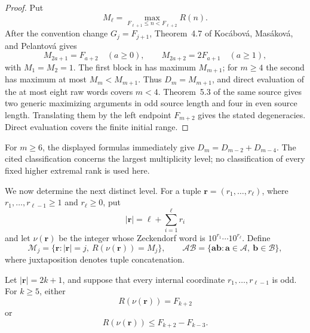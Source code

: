 \begin{proof}
Put
\[
 M_\ell=\max_{F_{\ell+1}\le n<F_{\ell+2}}R(n).
\]
After the convention change \(G_j=F_{j+1}\), Theorem~4.7 of
Koc\'abov\'a, Mas\'akov\'a, and Pelantov\'a
\cite{KocabovaMasakovaPelantova2005} gives
\[
 M_{2a+1}=F_{a+2}\quad(a\ge0),
 \qquad M_{2a+2}=2F_{a+1}\quad(a\ge1),
\]
with \(M_1=M_2=1\).  The first block in
 has maximum \(M_{m+1}\); for \(m\ge4\)
the second has maximum at most \(M_m<M_{m+1}\).  Thus
\(D_m=M_{m+1}\), and direct evaluation of the at most eight raw words covers
\(m<4\).  Theorem~5.3 of the same source gives two generic maximizing
arguments in odd source length and four in even source length.  Translating
them by the left endpoint \(F_{m+2}\) gives the stated degeneracies.  Direct
evaluation covers the finite initial range.
\end{proof}

For \(m\ge6\), the displayed formulas immediately give
\(D_m=D_{m-2}+D_{m-4}\).  The cited classification concerns the largest
multiplicity level; no classification of every fixed higher extremal rank is
used here.

We now determine the next distinct level.  For a tuple
\(\mathbf r=(r_1,\ldots,r_\ell)\), where
\(r_1,\ldots,r_{\ell-1}\ge1\) and \(r_\ell\ge0\), put
\[
 |\mathbf r|=\ell+\sum_{i=1}^\ell r_i
\]
and let \(\nu(\mathbf r)\) be the integer whose Zeckendorf word is
\(10^{r_1}\cdots10^{r_\ell}\).  Define
\[
 \mathscr M_j=\{\mathbf r:|\mathbf r|=j,\
 R(\nu(\mathbf r))=M_j\},
 \qquad
 \mathscr A\mathscr B=\{\mathbf a\mathbf b:
 \mathbf a\in\mathscr A,\ \mathbf b\in\mathscr B\},
\]
where juxtaposition denotes tuple concatenation.

\begin{lemma}
\label{lem:odd-run-gap}
Let \(|\mathbf r|=2k+1\), and suppose that every internal coordinate
\(r_1,\ldots,r_{\ell-1}\) is odd.  For \(k\ge5\), either
\[
 R(\nu(\mathbf r))=F_{k+2}
\]
or
\[
 R(\nu(\mathbf r))\le F_{k+2}-F_{k-3}.
\]
\end{lemma}

